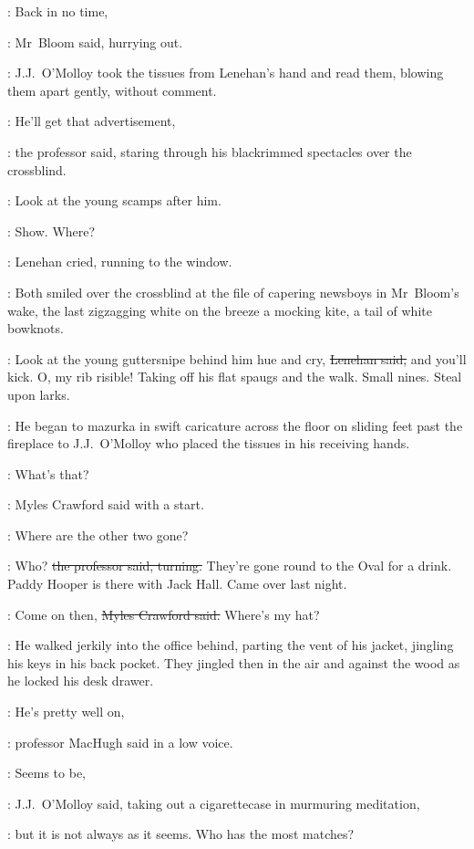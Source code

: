 \Bloom:
Back in no time,

:
Mr~Bloom said,
hurrying out.

:
J.J.~O'Molloy took the tissues from Lenehan's hand
and read them,
blowing them apart gently,
without comment.

\machugh:
He'll get that advertisement,

:
the professor said,
staring through his
blackrimmed spectacles over the crossblind.

\machugh:
Look at the young scamps after him.

\Bloom:
Show.
Where?

:
Lenehan cried,
running to the window.



:
Both smiled over the crossblind
at the file of capering newsboys in Mr~Bloom's wake,
the last zigzagging white on the breeze a mocking kite,
a tail of white bowknots.

\lenehan:
Look at the young guttersnipe behind him
hue and cry,
\sout{Lenehan said,}
and you'll kick.
O, my rib risible!
Taking off his flat spaugs and the walk.
Small nines.
Steal upon larks.

:
He began to mazurka in swift caricature across the floor
on sliding feet past the fireplace to J.J.~O'Molloy
who placed the tissues in his receiving hands.

\crawford:
What's that?

:
Myles Crawford said
with a start.

\crawford:
Where are the other two gone?

\machugh:
Who?
\sout{the professor said, turning.}
They're gone round to the Oval for a drink.
Paddy Hooper is there with Jack Hall.
Came over last night.

\crawford:
Come on then,
\sout{Myles Crawford said.}
Where's my hat?

:
He walked jerkily into the office behind,
parting the vent of his jacket,
jingling his keys in his back pocket.
They jingled then in the air and against the wood
as he locked his desk drawer.

\machugh:
He's pretty well on,

:
professor MacHugh said in a low voice.

\jjom:
Seems to be,

:
J.J.~O'Molloy said,
taking out a cigarettecase in murmuring meditation,

\jjom:
but it is not always as it seems.
Who has the most matches?



